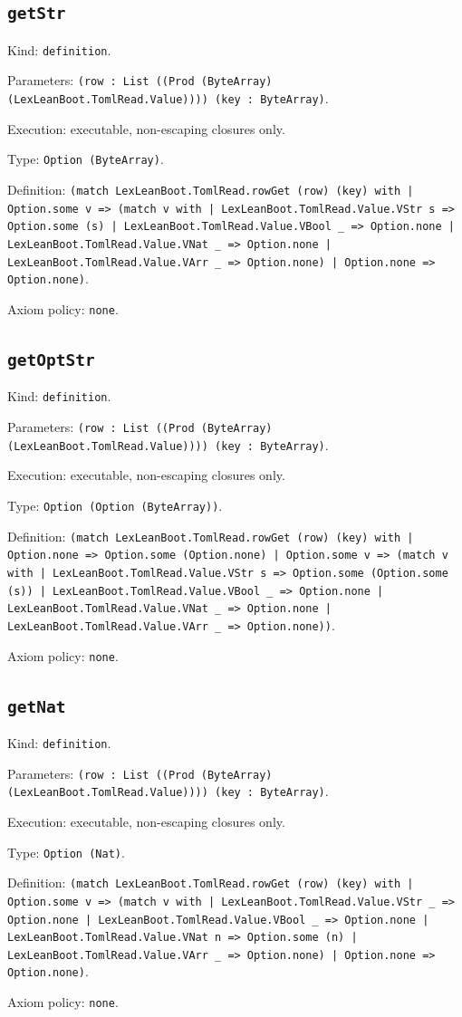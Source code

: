 \documentclass[11pt]{article}
\begin{document}
\subsection*{\texttt{getStr}}
\noindent Kind: \texttt{definition}.\par
\noindent Parameters: \texttt{(row : List ((Prod (ByteArray) (LexLeanBoot.TomlRead.Value)))) (key : ByteArray)}.\par
\noindent Execution: executable, non-escaping closures only.\par
\noindent Type: \texttt{Option (ByteArray)}.\par
\noindent Definition: \texttt{(match LexLeanBoot.TomlRead.rowGet (row) (key) with | Option.some v => (match v with | LexLeanBoot.TomlRead.Value.VStr s => Option.some (s) | LexLeanBoot.TomlRead.Value.VBool \_ => Option.none | LexLeanBoot.TomlRead.Value.VNat \_ => Option.none | LexLeanBoot.TomlRead.Value.VArr \_ => Option.none) | Option.none => Option.none)}.\par
\noindent Axiom policy: \texttt{none}.\par
\subsection*{\texttt{getOptStr}}
\noindent Kind: \texttt{definition}.\par
\noindent Parameters: \texttt{(row : List ((Prod (ByteArray) (LexLeanBoot.TomlRead.Value)))) (key : ByteArray)}.\par
\noindent Execution: executable, non-escaping closures only.\par
\noindent Type: \texttt{Option (Option (ByteArray))}.\par
\noindent Definition: \texttt{(match LexLeanBoot.TomlRead.rowGet (row) (key) with | Option.none => Option.some (Option.none) | Option.some v => (match v with | LexLeanBoot.TomlRead.Value.VStr s => Option.some (Option.some (s)) | LexLeanBoot.TomlRead.Value.VBool \_ => Option.none | LexLeanBoot.TomlRead.Value.VNat \_ => Option.none | LexLeanBoot.TomlRead.Value.VArr \_ => Option.none))}.\par
\noindent Axiom policy: \texttt{none}.\par
\subsection*{\texttt{getNat}}
\noindent Kind: \texttt{definition}.\par
\noindent Parameters: \texttt{(row : List ((Prod (ByteArray) (LexLeanBoot.TomlRead.Value)))) (key : ByteArray)}.\par
\noindent Execution: executable, non-escaping closures only.\par
\noindent Type: \texttt{Option (Nat)}.\par
\noindent Definition: \texttt{(match LexLeanBoot.TomlRead.rowGet (row) (key) with | Option.some v => (match v with | LexLeanBoot.TomlRead.Value.VStr \_ => Option.none | LexLeanBoot.TomlRead.Value.VBool \_ => Option.none | LexLeanBoot.TomlRead.Value.VNat n => Option.some (n) | LexLeanBoot.TomlRead.Value.VArr \_ => Option.none) | Option.none => Option.none)}.\par
\noindent Axiom policy: \texttt{none}.\par
\end{document}
